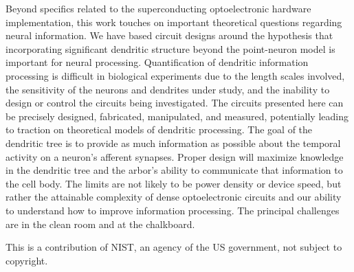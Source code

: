 \documentclass[twocolumn]{article}
\begin{document}
Beyond specifics related to the superconducting optoelectronic hardware implementation, this work touches on important theoretical questions regarding neural information. We have based circuit designs around the hypothesis that incorporating significant dendritic structure beyond the point-neuron model is important for neural processing. Quantification of dendritic information processing is difficult in biological experiments due to the length scales involved, the sensitivity of the neurons and dendrites under study, and the inability to design or control the circuits being investigated. The circuits presented here can be precisely designed, fabricated, manipulated, and measured, potentially leading to traction on theoretical models of dendritic processing. The goal of the dendritic tree is to provide as much information as possible about the temporal activity on a neuron's afferent synapses. Proper design will maximize knowledge in the dendritic tree and the arbor's ability to communicate that information to the cell body. The limits are not likely to be power density or device speed, but rather the attainable complexity of dense optoelectronic circuits and our ability to understand how to improve information processing. The principal challenges are in the clean room and at the chalkboard. 

\vspace{2em}
This is a contribution of NIST, an agency of the US government, not subject to copyright.
	



\end{document}
